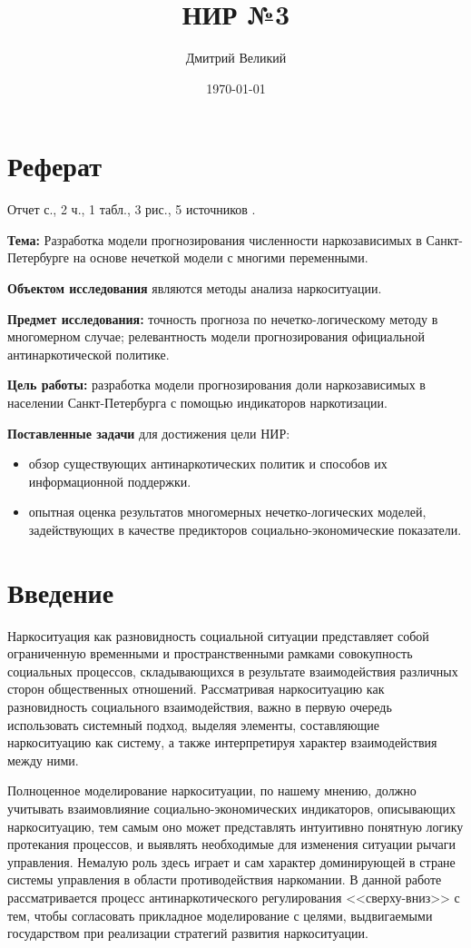 \documentclass[a4paper,14pt]{article}
\author{Дмитрий Великий}
\title{НИР №3}
\date{\today}
\begin{document}

\tableofcontents

\newpage
\section*{\centering Реферат}
Отчет \pageref{LastPage} с., 2 ч., 1 табл., 3 рис., 5 источников .

\textbf{Тема:} Разработка модели прогнозирования численности наркозависимых в 
Санкт-Петербурге на основе нечеткой модели с многими переменными.

\textbf{Объектом исследования} являются методы анализа наркоситуации.

\textbf{Предмет исследования:} точность прогноза по нечетко-логическому методу в 
многомерном случае; релевантность модели прогнозирования официальной 
антинаркотической политике.

\textbf{Цель работы:} разработка модели прогнозирования доли наркозависимых в 
населении Санкт-Петербурга с помощью индикаторов наркотизации.

\textbf{Поставленные задачи} для достижения цели НИР:
\begin{itemize}
    \item обзор существующих антинаркотических политик и способов их 
        информационной поддержки.
    \item опытная оценка результатов многомерных нечетко-логических моделей, 
        задействующих в качестве предикторов социально-экономические показатели.
\end{itemize} 

\newpage
\section*{Введение}

Наркоситуация как разновидность социальной ситуации представляет собой 
ограниченную временными и пространственными рамками совокупность социальных 
процессов, складывающихся в результате взаимодействия различных сторон 
общественных отношений.  Рассматривая наркоситуацию как разновидность 
социального взаимодействия, важно в первую очередь использовать системный 
подход, выделяя элементы, составляющие наркоситуацию как систему, а также 
интерпретируя характер взаимодействия между ними.

Полноценное моделирование наркоситуации, по нашему мнению, должно учитывать 
взаимовлияние социально-экономических индикаторов, описывающих наркоситуацию, 
тем самым оно может представлять интуитивно понятную логику протекания 
процессов, и выявлять необходимые для изменения ситуации рычаги управления.  
Немалую роль здесь играет и сам характер доминирующей в стране системы 
управления в области противодействия наркомании.  В данной работе 
рассматривается процесс антинаркотического регулирования <<сверху-вниз>> с тем, 
чтобы согласовать прикладное моделирование с целями, выдвигаемыми государством 
при реализации стратегий развития наркоситуации.
\end{document}
